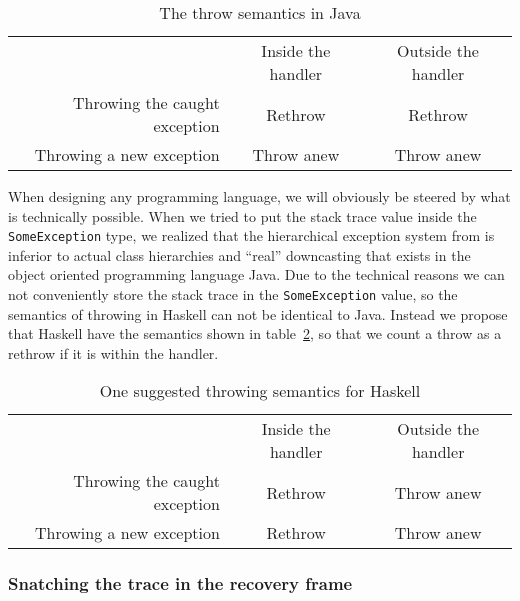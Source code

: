 \begin{table}[t]
  \centering
  \begin{tabular}{r|c|c|}
    \multicolumn{1}{r}{}
    &  \multicolumn{1}{c}{Inside the handler}
    & \multicolumn{1}{c}{Outside the handler} \\
    \cline{2-3}
    Throwing the caught exception & Rethrow    & Rethrow \\
    \cline{2-3}
    Throwing a new exception      & Throw anew & Throw anew \\
    \cline{2-3}
  \end{tabular}
  \caption{The throw semantics in Java}
  \label{tab:java_throw_semantics}
\end{table}

When designing any programming language, we will obviously be steered by
what is technically possible. When we tried to put the stack trace value
inside the \texttt{SomeException} type, we realized that the
hierarchical exception system from \cite{marlow2006extensible} is
inferior to actual class hierarchies and ``real'' downcasting that exists in the
object oriented programming language Java. Due to the technical reasons
we can not conveniently store the stack trace in the
\texttt{SomeException} value, so the semantics of throwing in Haskell
can not be identical to Java. Instead we propose that Haskell have the
semantics shown in table~\ref{tab:haskell_throw_semantics}, so that we count a throw as a rethrow if
it is within the handler.

\begin{table}[t]
  \centering
  \begin{tabular}{r|c|c|}
    \multicolumn{1}{r}{}
    &  \multicolumn{1}{c}{Inside the handler}
    & \multicolumn{1}{c}{Outside the handler} \\
    \cline{2-3}
    Throwing the caught exception & Rethrow & Throw anew \\
    \cline{2-3}
    Throwing a new exception      & Rethrow & Throw anew \\
    \cline{2-3}
  \end{tabular}
  \caption{One suggested throwing semantics for Haskell}
  \label{tab:haskell_throw_semantics}
\end{table}


\subsubsection{Snatching the trace in the recovery frame}

